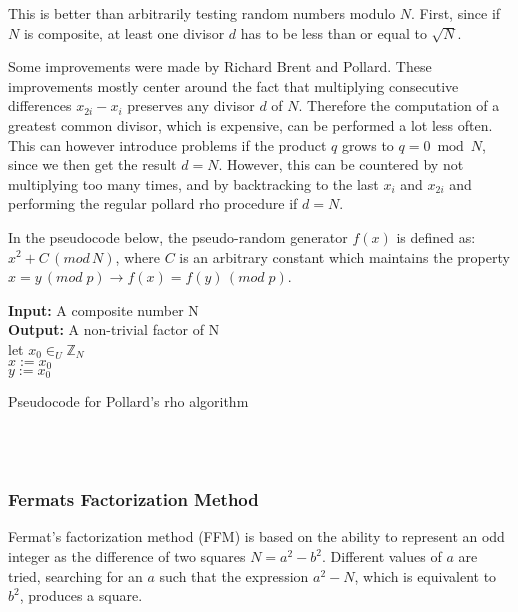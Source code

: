\documentclass[paper=a4, fontsize=11pt,numbers=endperiod]{scrartcl} %
\providecommand{\abs}[1]{\lvert#1\rvert} %
\numberwithin{equation}{section} %
\numberwithin{figure}{section} %
\numberwithin{table}{section} %
\begin{document}
This is better than arbitrarily testing random numbers modulo $N$.
First, since if $N$ is composite, at least one divisor $d$ has to be less than or equal to $\sqrt{N}$.

Some improvements were made by Richard Brent and Pollard.\cite{brent}
These improvements mostly center around the fact that multiplying consecutive differences $x_{2i}-x_i$ preserves any divisor $d$ of $N$.
Therefore the computation of a greatest common divisor, which is expensive, can be performed a lot less often.
This can however introduce problems if the product $q$ grows to $q = 0 \bmod N$, since we then get the result $d=N$.
However, this can be countered by not multiplying too many times, and by backtracking to the last $x_i$ and $x_{2i}$ and performing the regular pollard rho procedure if $d=N$.


In the pseudocode below, the pseudo-random generator $f(x)$ is defined as: $x^2+C\, (mod\, N)$, where $C$ is an arbitrary constant which maintains the property\\ $x = y\, (mod\; p) \rightarrow f(x) = f(y)\,(mod\; p)$.\\

\begin{algorithm}[H]
 \SetAlgoLined %
 \textbf{Input:} {A composite number N}\\
 \textbf{Output:} {A non-trivial factor of N}\\
 let $x_0 \in_U \mathbb{Z}_N$\\
 $x := x_0$\\
 $y := x_0$\\
 \While{True}{
  $x := f(x)$\;
  $y := f(f(y))$\;
  $d := gcd( \abs{y-x}, N)$\;
  \If{$d > 1$}{
   return d\;
   }
 }
 \caption{Pseudocode for Pollard's rho algorithm}
\end{algorithm}

\hspace{0pt}\\\\

\subsubsection{Fermats Factorization Method}
Fermat's factorization method (FFM) \cite{fermat} is based on the ability to represent an odd integer as the difference of two squares $N = a^2 - b^2$.
Different values of $a$ are tried, searching for an $a$ such that the expression $a^2 - N$, which is equivalent to $b^2$, produces a square.
\end{document}
